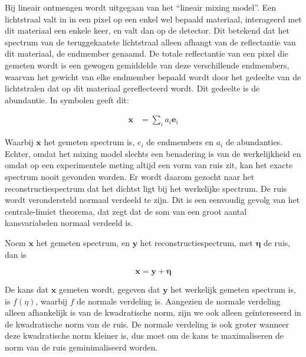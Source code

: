 \documentclass[12pt]{report}
\begin{document}
Bij lineair ontmengen wordt uitgegaan van het ``lineair mixing model''. Een lichtstraal valt in in een pixel op een enkel wel bepaald materiaal, interageerd met dit materiaal een enkele keer, en valt dan op de detector. Dit betekend dat het spectrum van de teruggekaatste lichtstraal alleen afhangt van de reflectantie van dit materiaal, de endmember genaamd. De totale reflectantie van een pixel die gemeten wordt is een gewogen gemiddelde van deze verschillende endmembers, waarvan het gewicht van elke endmember bepaald wordt door het gedeelte van de lichtstralen dat op dit materiaal gereflecteerd wordt. Dit gedeelte is de abundantie. In symbolen geeft dit:




\begin{align}
\bm{x} &= \sum_i a_i \bm{e}_i \label{eq:nq}
\end{align}

Waarbij $\bm{x}$ het gemeten spectrum is, $e_i$ de endmembers en  $a_i$ de abundanties.
Echter, omdat het mixing model slechts een benadering is van de werkelijkheid en omdat op een experimentele meting altijd een vorm van ruis zit, kan het exacte spectrum nooit gevonden worden. Er wordt daarom gezocht naar het reconstructiespectrum dat het dichtst ligt bij het werkelijke spectrum. De ruis wordt verondersteld normaal verdeeld te zijn. Dit is een eenvoudig gevolg van het centrale-limiet theorema, dat zegt dat de som van een groot aantal kansvariabelen normaal verdeeld is. 

Noem $\bm{x}$ het gemeten spectrum, en $\bm{y}$ het reconstructiespectrum, met $\bm{\eta}$ de ruis, dan is

\begin{equation}\label{eq:rec0}
\bm{x} = \bm{y} + \bm{\eta}
\end{equation}

De kans dat $\bm{x}$ gemeten wordt, gegeven dat $\bm{y}$ het werkelijk gemeten spectrum is, is $f(\eta)$, waarbij $f$ de normale verdeling is. Aangezien de normale verdeling alleen afhankelijk is van de kwadratische norm, zijn we ook alleen ge\"intereseerd in de kwadratische norm van de ruis. De normale verdeling is ook groter wanneer deze kwadratische norm kleiner is, dus moet om de kans te maximaliseren de norm van de ruis geminimaliseerd worden. 
\end{document}
